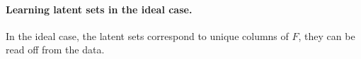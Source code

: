 \documentclass{article}
\begin{document}
\paragraph{Learning latent sets in the ideal case.}
In the ideal case, the latent sets correspond to unique columns of $F$, they can be read off from the data.



\printbibliography
\end{document}
